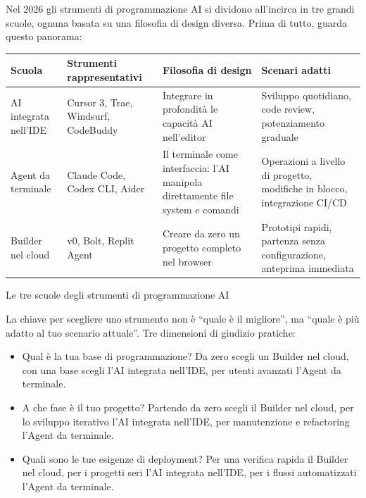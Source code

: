 


Nel 2026 gli strumenti di programmazione AI si dividono all'incirca in tre grandi scuole, ognuna basata su una filosofia di design diversa. Prima di tutto, guarda questo panorama:

\begin{center}
\begin{tabularx}{\linewidth}{|X|X|X|X|}
\hline
\textbf{Scuola} & \textbf{Strumenti rappresentativi} & \textbf{Filosofia di design} & \textbf{Scenari adatti} \tabularnewline
\hline
AI integrata nell'IDE & Cursor 3, Trae, Windsurf, CodeBuddy & Integrare in profondità le capacità AI nell'editor & Sviluppo quotidiano, code review, potenziamento graduale \tabularnewline
Agent da terminale & Claude Code, Codex CLI, Aider & Il terminale come interfaccia: l'AI manipola direttamente file system e comandi & Operazioni a livello di progetto, modifiche in blocco, integrazione CI/CD \tabularnewline
Builder nel cloud & v0, Bolt, Replit Agent & Creare da zero un progetto completo nel browser & Prototipi rapidi, partenza senza configurazione, anteprima immediata \tabularnewline
\hline
\end{tabularx}
\end{center}

\begin{center}\small\color{gray}Le tre scuole degli strumenti di programmazione AI\end{center}

La chiave per scegliere uno strumento non è “quale è il migliore”, ma “quale è più adatto al tuo scenario attuale”. Tre dimensioni di giudizio pratiche:

\begin{itemize}
  \item Qual è la tua base di programmazione? Da zero scegli un Builder nel cloud, con una base scegli l'AI integrata nell'IDE, per utenti avanzati l'Agent da terminale.
  \item A che fase è il tuo progetto? Partendo da zero scegli il Builder nel cloud, per lo sviluppo iterativo l'AI integrata nell'IDE, per manutenzione e refactoring l'Agent da terminale.
  \item Quali sono le tue esigenze di deployment? Per una verifica rapida il Builder nel cloud, per i progetti seri l'AI integrata nell'IDE, per i flussi automatizzati l'Agent da terminale.
\end{itemize}

